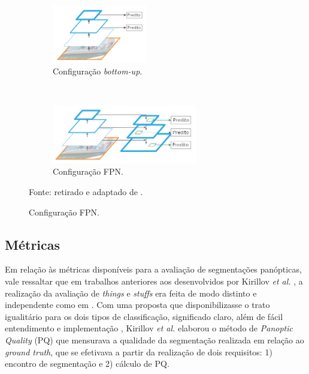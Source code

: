 \begin{figure}[H]
   \caption{Extrações de características \textit{bottom-up} e FPN.}
   \centering
   \label{panoptic:fig:2}
    \begin{subfigure}[t]{0.45\textwidth}
        \centering
        \includegraphics[height=1in]{recursos/imagens/panoptic/bottom-up.png}
        \caption{Configuração \textit{bottom-up}.}
        \label{panoptic:fig:2.1}
    \end{subfigure}%
    ~ 
    \begin{subfigure}[t]{0.45\textwidth}
        \centering
        \includegraphics[height=1in]{recursos/imagens/panoptic/FPN.png}
        \caption{Configuração FPN.}
        \label{panoptic:fig:2.2}
    \end{subfigure}%

    \vspace*{1 cm}
    Fonte: retirado e adaptado de \cite{Lin2016}.
\end{figure}


\subsection{Métricas}
\label{panoptic:metrics}
Em relação às métricas disponíveis para a avaliação de segmentações panópticas, vale ressaltar que em trabalhos anteriores aos desenvolvidos por Kirillov \textit{et al.} \cite{Kirillov2019a}, a realização da avaliação de \textit{things} e \textit{stuffs} era feita de modo distinto e independente como em \cite{Sun2014, Yao2012}. Com uma proposta que disponibilizasse o trato igualitário para os dois tipos de classificação, significado claro, além de fácil entendimento e implementação , Kirillov \textit{et al.} \cite{Kirillov2019a} elaborou o método de \textit{Panoptic Quality} (PQ) que mensurava a qualidade da segmentação realizada em relação ao \textit{ground truth}, que se efetivava  a partir da realização de dois requisitos: 1) encontro de segmentação e  2) cálculo de PQ.

